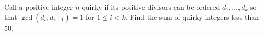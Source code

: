 Call a positive integer $n$ quirky if its positive divisors can be ordered $d_1,\ldots,d_k$ so that $\gcd(d_i,d_{i+1})=1$ for $1\le i<k$. Find the sum of quirky integers less than 50.
